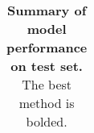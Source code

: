 \documentclass{article}\usepackage[]{graphicx}\usepackage[]{color}
\begin{document}
\begin{table}[ht]
\begin{tabular}{@{}|l|c|c|@{}}
\hline                                                                                                                                                                                                                                                                                                                                                                                                                                                                                                                                                                                   \end{tabular}                                                                                                                                                                                                                                                                                                                                                                                                                                                                                                                                                                                   \caption{\textbf{Summary of model performance on test set.} The best method is bolded.}                                                                                                                                                                                                                                                                                                                                                                                                                                                                                                         \label{tab-results}                                                                                                                                                                                                                                                                                                                                                                                                                                                                                                         \end{table}
\end{document}
